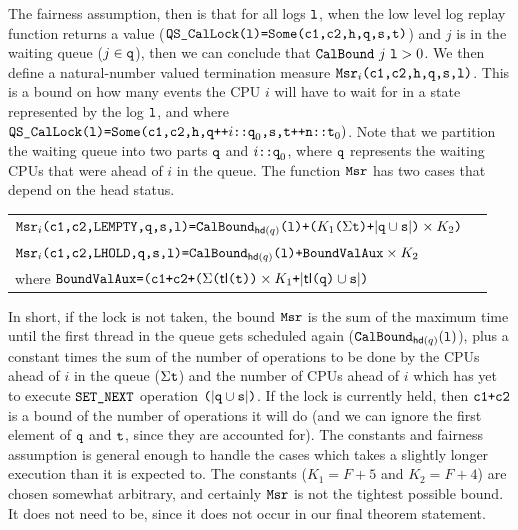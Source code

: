 The fairness assumption, then is that for all logs ${\mathrm{\texttt{l}}}$, 
when the low level log replay function returns a 
value (${\mathrm{\texttt{QS\_CalLock}}}{\mathrm{\texttt{(l)=}}}{\mathrm{\texttt{Some}}}{\mathrm{\texttt{(c1,c2,h,q,s,t)}}}$) and $j$ is 
in the waiting queue ($j \in {\mathrm{\texttt{q}}}$), then we can conclude that ${\mathrm{\texttt{CalBound}}}\ j\ {\mathrm{\texttt{l}}}>0$. 
We then define a natural-number valued termination measure ${\mathrm{\texttt{Msr}}}_i{\mathrm{\texttt{(c1,c2,h,q,s,l)}}}$.  
This is a bound on how many events the CPU $i$ will
have to wait for in a state represented by the log ${\mathrm{\texttt{l}}}$, and where
${\mathrm{\texttt{QS\_CalLock}}}{\mathrm{\texttt{(l)=}}}{\mathrm{\texttt{Some}}}{\mathrm{\texttt{(c1,c2,h,q++}}}i{\mathrm{\texttt{::q}}}_0{\mathrm{\texttt{,s,t++n::t}}}_0)$.
Note that
we partition the waiting queue into two parts ${\mathrm{\texttt{q}}}$ 
and $i{\mathrm{\texttt{::q}}}_0$, where ${\mathrm{\texttt{q}}}$
represents the waiting CPUs that were ahead of $i$ in the queue.
The function ${\mathrm{\texttt{Msr}}}$ has two cases that depend on the head status.
\begin{center}
\begin{tabular}{p{0.95\linewidth}}
${\mathrm{\texttt{Msr}}}_i{\mathrm{\texttt{(c1,c2,}}}{\mathrm{\texttt{LEMPTY}}}{\mathrm{\texttt{,q,s,l)=}}}{\mathrm{\texttt{CalBound}}}_{\mathsf{hd}(q)}{\mathrm{\texttt{(l)+(}}}K_1{\mathrm{\texttt{(}}}\Sigma{\mathrm{\texttt{t)+}}}|{\mathrm{\texttt{q}}}\cup{\mathrm{\texttt{s}}}|{\mathrm{\texttt{)}}}\times K_2{\mathrm{\texttt{)}}}$\\
${\mathrm{\texttt{Msr}}}_i{\mathrm{\texttt{(c1,c2,}}}{\mathrm{\texttt{LHOLD}}}{\mathrm{\texttt{,q,s,l)=}}}{\mathrm{\texttt{CalBound}}}_{\mathsf{hd}(q)}{\mathrm{\texttt{(l)+}}}{\mathrm{\texttt{BoundValAux}}}\times K_2$ \\
\hfill	 where ${\mathrm{\texttt{BoundValAux}}}{\mathrm{\texttt{=(c1+c2+(}}}\Sigma{\mathrm{\texttt{(}}}\mathsf{tl}{\mathrm{\texttt{(t))}}}\times K_1{\mathrm{\texttt{+}}}|\mathsf{tl}{\mathrm{\texttt{(q)}}}\cup{\mathrm{\texttt{s}}}|{\mathrm{\texttt{)}}}$\\
\end{tabular}
\end{center}

In short, if the lock is not taken, the bound ${\mathrm{\texttt{Msr}}}$ is the sum of the
maximum time until the first thread in the queue gets scheduled again
(${\mathrm{\texttt{CalBound}}}_{\mathsf{hd}(q)}({\mathrm{\texttt{l}}})$), plus a constant times
the sum of the number of operations to be done
by the CPUs ahead of $i$ in the queue ($\Sigma{\mathrm{\texttt{t}}}$) 
and the number of CPUs ahead of $i$ which has
yet to execute ${\mathrm{\texttt{SET\_NEXT}}}$ operation 
${\mathrm{\texttt{(}}}|{\mathrm{\texttt{q}}}\cup{\mathrm{\texttt{s}}}|{\mathrm{\texttt{)}}}$. If the lock is currently
held, then ${\mathrm{\texttt{{c1+c2}}}}$ is a bound of the number of operations it will
do
(and we can ignore the first element of ${\mathrm{\texttt{q}}}$ and ${\mathrm{\texttt{t}}}$, since they are
accounted for).
The constants and fairness assumption is general enough to handle the cases which takes a slightly longer execution than it is expected to.
The constants ($K_1 = F+5$ and $K_2 = F+4$) are chosen somewhat
arbitrary, and certainly ${\mathrm{\texttt{Msr}}}$ is not the tightest possible bound. It
does not need to be, since it does not occur in our final theorem
statement.


